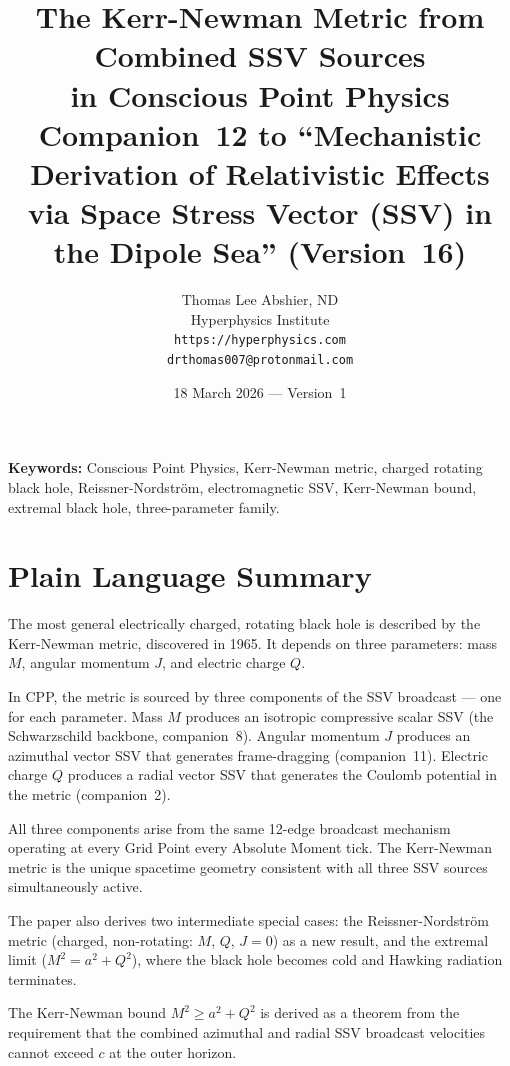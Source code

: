 \documentclass[12pt]{article}
\title{\textbf{The Kerr-Newman Metric from Combined SSV Sources\\
in Conscious Point Physics}\\[6pt]
{\large Companion~12 to ``Mechanistic Derivation of Relativistic Effects\\
via Space Stress Vector (SSV) in the Dipole Sea'' (Version~16)}}
\author{Thomas Lee Abshier, ND\\
Hyperphysics Institute\\
\texttt{https://hyperphysics.com}\\
\texttt{drthomas007@protonmail.com}}
\date{18 March 2026 --- Version~1}
\begin{document}
\maketitle

\noindent\textbf{Keywords:} Conscious Point Physics, Kerr-Newman metric,
charged rotating black hole, Reissner-Nordstr\"om, electromagnetic SSV,
Kerr-Newman bound, extremal black hole, three-parameter family.

\section*{Plain Language Summary}

The most general electrically charged, rotating black hole is described
by the Kerr-Newman metric, discovered in 1965.  It depends on three
parameters: mass $M$, angular momentum $J$, and electric charge $Q$.

In CPP, the metric is sourced by three components of the SSV broadcast
— one for each parameter.  Mass $M$ produces an isotropic compressive
scalar SSV (the Schwarzschild backbone, companion~8).  Angular momentum
$J$ produces an azimuthal vector SSV that generates frame-dragging
(companion~11).  Electric charge $Q$ produces a radial vector SSV that
generates the Coulomb potential in the metric (companion~2).

All three components arise from the same 12-edge broadcast mechanism
operating at every Grid Point every Absolute Moment tick.  The
Kerr-Newman metric is the unique spacetime geometry consistent with all
three SSV sources simultaneously active.

The paper also derives two intermediate special cases: the
Reissner-Nordström metric (charged, non-rotating: $M$, $Q$, $J=0$)
as a new result, and the extremal limit ($M^2 = a^2 + Q^2$), where
the black hole becomes cold and Hawking radiation terminates.

The Kerr-Newman bound $M^2 \geq a^2 + Q^2$ is derived as a theorem
from the requirement that the combined azimuthal and radial SSV
broadcast velocities cannot exceed $c$ at the outer horizon.
\end{document}
